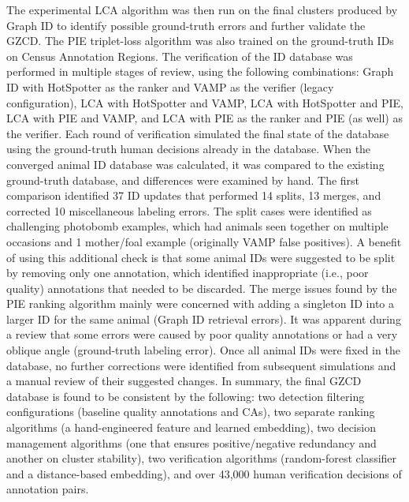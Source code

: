 The experimental LCA algorithm was then run on the final clusters produced by Graph ID to identify possible ground-truth errors and further validate the GZCD.  The PIE triplet-loss algorithm was also trained on the ground-truth IDs on Census Annotation Regions.  The verification of the ID database was performed in multiple stages of review, using the following combinations: Graph ID with HotSpotter as the ranker and VAMP as the verifier (legacy configuration), LCA with HotSpotter and VAMP, LCA with HotSpotter and PIE, LCA with PIE and VAMP, and LCA with PIE as the ranker and PIE (as well) as the verifier.  Each round of verification simulated the final state of the database using the ground-truth human decisions already in the database.  When the converged animal ID database was calculated, it was compared to the existing ground-truth database, and differences were examined by hand.  The first comparison identified 37 ID updates that performed 14 splits, 13 merges, and corrected 10 miscellaneous labeling errors.  The split cases were identified as challenging photobomb examples, which had animals seen together on multiple occasions and 1 mother/foal example (originally VAMP false positives).  A benefit of using this additional check is that some animal IDs were suggested to be split by removing only one annotation, which identified inappropriate (i.e., poor quality) annotations that needed to be discarded.  The merge issues found by the PIE ranking algorithm mainly were concerned with adding a singleton ID into a larger ID for the same animal (Graph ID retrieval errors).  It was apparent during a review that some errors were caused by poor quality annotations or had a very oblique angle (ground-truth labeling error).  Once all animal IDs were fixed in the database, no further corrections were identified from subsequent simulations and a manual review of their suggested changes.  In summary, the final GZCD database is found to be consistent by the following: two detection filtering configurations (baseline quality annotations and CAs), two separate ranking algorithms (a hand-engineered feature and learned embedding), two decision management algorithms (one that ensures positive/negative redundancy and another on cluster stability), two verification algorithms (random-forest classifier and a distance-based embedding), and over 43,000 human verification decisions of annotation pairs.

